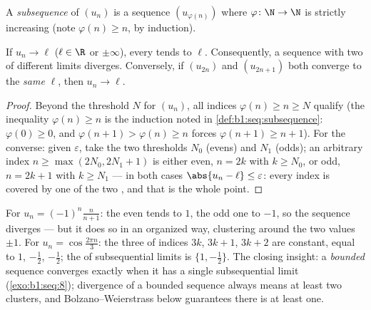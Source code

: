 \begin{definition}[Subsequence]\label{def:b1:seq:subsequence}
A \emph{subsequence} of $(u_n)$ is a sequence
$(u_{\varphi(n)})$ where $\varphi \colon \N \to \N$ is strictly
increasing (note $\varphi(n) \geq n$, by induction).
\end{definition}

\begin{proposition}\label{prop:b1:seq:subsequences}
If $u_n \to \ell$ ($\ell \in \R$ or $\pm\infty$), every 
tends to $\ell$. Consequently, a sequence with two  of
different limits diverges. Conversely, if $(u_{2n})$ and
$(u_{2n+1})$ both converge to the \emph{same} $\ell$, then $u_n \to
\ell$.
\end{proposition}

\begin{proof}
Beyond the threshold $N$ for $(u_n)$, all indices $\varphi(n) \geq n
\geq N$ qualify (the inequality $\varphi(n) \geq n$ is the
induction noted in \cref{def:b1:seq:subsequence}: $\varphi(0)
\geq 0$, and $\varphi(n+1) > \varphi(n) \geq n$ forces
$\varphi(n+1) \geq n + 1$). For the converse: given
$\varepsilon$, take the two thresholds $N_0$ (evens) and $N_1$
(odds); an arbitrary index $n \geq \max(2N_0, 2N_1 + 1)$ is
either even, $n = 2k$ with $k \geq N_0$, or odd, $n = 2k+1$ with
$k \geq N_1$ --- in both cases $\abs{u_n - \ell} \leq
\varepsilon$: every index is covered by one of the two
, and that is the whole point.
\end{proof}

\begin{example}\label{ex:b1:seq:sublimits}
For $u_n = (-1)^n \frac{n}{n+1}$: the even  tends to
$1$, the odd one to $-1$, so the sequence diverges --- but it does
so in an organized way, clustering around the two values $\pm 1$.
For $u_n = \cos\frac{2\pi n}{3}$: the three  of
indices $3k$, $3k + 1$, $3k + 2$ are constant, equal to $1$,
$-\frac12$, $-\frac12$; the  of subsequential limits is $\{1,
-\frac12\}$. The closing insight: a \emph{bounded} sequence
converges exactly when it has a single subsequential limit
(\cref{exo:b1:seq:8}); divergence of a bounded sequence always
means at least two clusters, and Bolzano--Weierstrass below
guarantees there is at least one.
\end{example}

